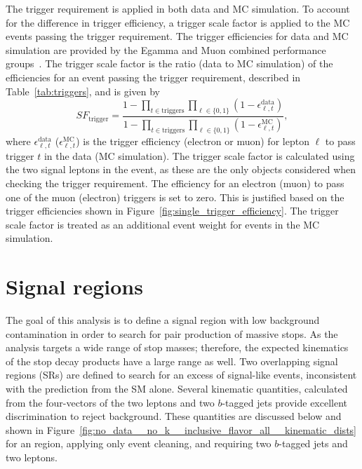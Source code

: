 The trigger requirement is applied in both data and MC simulation.
To account for the difference in trigger efficiency, a trigger scale factor is
applied to the MC events passing the trigger requirement.
The trigger efficiencies for data and MC simulation are provided by
the Egamma and Muon combined performance
groups~\cite{ATLAS-CONF-2014-032,Aad:2014rra}.
The trigger scale factor is the ratio (data to MC simulation) of the
efficiencies for an event passing the trigger requirement, described in
Table~\ref{tab:triggers}, and is given by
\begin{equation}
  SF_\mathrm{trigger} =
  \frac{1- \prod_{t \in \mathrm{triggers}}\prod_{\ell \in \{0,1\}}
                 (1-\epsilon_{\ell, t}^\mathrm{data})}
       {1- \prod_{t \in \mathrm{triggers}}\prod_{\ell \in \{0,1\}}
                 (1-\epsilon_{\ell, t}^\mathrm{MC})},
\end{equation}
where $\epsilon_{\ell,t}^\mathrm{data}$ ($\epsilon_{\ell,t}^\mathrm{MC}$) is
the trigger efficiency (electron or muon) for lepton $\ell$ to pass trigger $t$
in the data (MC simulation).
The trigger scale factor is calculated using the two signal leptons in the
event, as these are the only objects considered when checking the trigger
requirement.
The efficiency for an electron (muon) to pass one of the muon (electron)
triggers is set to zero.
This is justified based on the trigger efficiencies shown in
Figure~\ref{fig:single_trigger_efficiency}.
The trigger scale factor is treated as an additional event weight for events in
the MC simulation.

\FloatBarrier
\section{Signal regions}
\label{sec:signal_regions}

The goal of this analysis is to define a signal region with low background
contamination in order to search for pair production of massive stops.
As the analysis targets a wide range of stop masses; therefore, the expected
kinematics of the stop decay products have a large range as well.
Two overlapping signal regions (SRs) are defined to search for an excess of
signal-like events, inconsistent with the prediction from the SM alone.
Several kinematic quantities, calculated from the four-vectors of the two
leptons and two $b$-tagged jets provide excellent discrimination to reject
background. 
These quantities are discussed below and shown in
Figure~\ref{fig:no_data__no_k__inclusive_flavor_all__kinematic_dists} for an
region, applying only event cleaning, and requiring two $b$-tagged jets and
two leptons.

